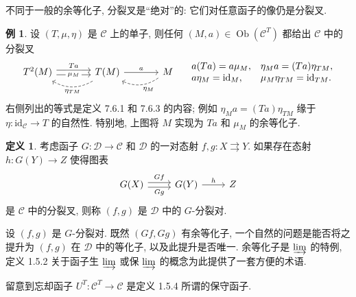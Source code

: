 \documentclass[11pt]{article}
\newcommand{\identity}{\mathrm{id}}
\newcommand{\Obj}{\operatorname{Ob}}
\newcommand{\CorpusNumber}{0}
\theoremstyle{definition}
\newtheorem{definition}[theorem]{定义}
\newtheorem{example}[theorem]{例}
\begin{document}
不同于一般的余等化子, 分裂叉是``绝对''的: 它们对任意函子的像仍是分裂叉.

\def\CorpusNumber{7.6.10}
\begin{example}\label{eg:T-split-fork}
	设 $(T, \mu, \eta)$ 是 $\mathcal{C}$ 上的单子, 则任何 $(M, a) \in \Obj(\mathcal{C}^T)$ 都给出 $\mathcal{C}$ 中的分裂叉
	\begin{equation*}\begin{tikzcd}[column sep=large]
			T^2(M) \arrow[shift left, r, "Ta"] \arrow[shift right, r, "\mu_M" description] & T(M) \arrow[r, "a"] \arrow[dashed, bend left, l, "\eta_{TM}"] & M \arrow[dashed, bend left, l, "\eta_M"]
		\end{tikzcd} \quad \begin{array}{ll}
			a (Ta) = a \mu_M , & \eta_M a = (Ta) \eta_{TM}, \\
			a \eta_M = \identity_M , & \mu_M \eta_{TM} = \identity_{TM}.
	\end{array}\end{equation*}
	右侧列出的等式是定义 7.6.1 和 7.6.3 的内容; 例如 $\eta_M a = (Ta) \eta_{TM}$ 缘于 $\eta: \identity_{\mathcal{C}} \to T$ 的自然性. 特别地, 上图将 $M$ 实现为 $Ta$ 和 $\mu_M$ 的余等化子.
\end{example}

\def\CorpusNumber{7.6.11}
\begin{definition}\label{def:Beck-split-pair}
	考虑函子 $G: \mathcal{D}\to \mathcal{C}$ 和 $\mathcal{D}$ 的一对态射 $f, g: X \rightrightarrows Y$. 如果存在态射 $h: G(Y) \to Z$ 使得图表
	\begin{equation*}\begin{tikzcd}
			G(X) \arrow[shift left, r, "Gf"] \arrow[shift right, r, "Gg"'] & G(Y) \arrow[r, "h"] & Z
	\end{tikzcd}\end{equation*}
	是 $\mathcal{C}$ 中的分裂叉, 则称 $(f, g)$ 是 $\mathcal{D}$ 中的 $G$-分裂对.
\end{definition}

设 $(f, g)$ 是 $G$-分裂对. 既然 $(Gf, Gg)$ 有余等化子, 一个自然的问题是能否将之提升为 $(f, g)$ 在 $\mathcal{D}$ 中的等化子, 以及此提升是否唯一. 余等化子是 $\varinjlim$ 的特例, 定义 1.5.2 关于函子生 $\varinjlim$ 或保 $\varinjlim$ 的概念为此提供了一套方便的术语.

留意到忘却函子 $U^T: \mathcal{C}^T \to \mathcal{C}$ 是定义 1.5.4 所谓的保守函子.
\end{document}
